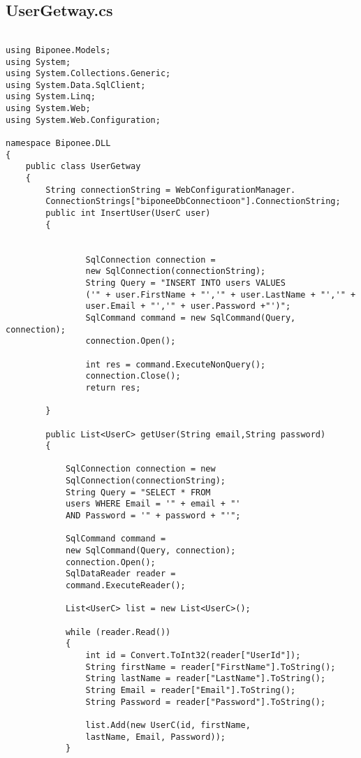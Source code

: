 \subsection{UserGetway.cs}
\begin{lstlisting}

using Biponee.Models;
using System;
using System.Collections.Generic;
using System.Data.SqlClient;
using System.Linq;
using System.Web;
using System.Web.Configuration;

namespace Biponee.DLL
{
    public class UserGetway
    {
        String connectionString = WebConfigurationManager.
        ConnectionStrings["biponeeDbConnectioon"].ConnectionString;
        public int InsertUser(UserC user)
        {
           
          
                SqlConnection connection = 
                new SqlConnection(connectionString);
                String Query = "INSERT INTO users VALUES 
                ('" + user.FirstName + "','" + user.LastName + "','" + 
                user.Email + "','" + user.Password +"')";
                SqlCommand command = new SqlCommand(Query, connection);
                connection.Open();
                
                int res = command.ExecuteNonQuery();
                connection.Close();
                return res;
            
        }

        public List<UserC> getUser(String email,String password)
        {

            SqlConnection connection = new 
            SqlConnection(connectionString);
            String Query = "SELECT * FROM 
            users WHERE Email = '" + email + "' 
            AND Password = '" + password + "'";

            SqlCommand command = 
            new SqlCommand(Query, connection);
            connection.Open();
            SqlDataReader reader = 
            command.ExecuteReader();

            List<UserC> list = new List<UserC>();

            while (reader.Read())
            {
                int id = Convert.ToInt32(reader["UserId"]);
                String firstName = reader["FirstName"].ToString();
                String lastName = reader["LastName"].ToString();
                String Email = reader["Email"].ToString();
                String Password = reader["Password"].ToString();

                list.Add(new UserC(id, firstName, 
                lastName, Email, Password));
            }


\end{lstlisting}
